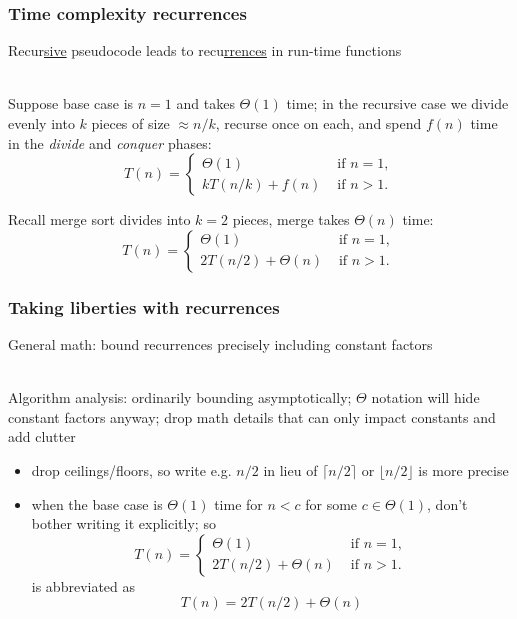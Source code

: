 \documentclass{beamer}
\newcommand{\stanza}{ \\~\ }
\begin{document}
\begin{frame} \frametitle{Time complexity recurrences}

Recur\underline{sive} pseudocode leads to recu\underline{rrences} in
  run-time functions \stanza

Suppose base case is $n=1$ and takes $\Theta(1)$ time; in the recursive
case we divide evenly into $k$ pieces of size $\approx n/k$, recurse once
on each, and spend $f(n)$ time in the \emph{divide} and \emph{conquer}
phases:
\begin{equation*}
  T(n) = \begin{cases}
          \Theta(1) & \text{ if } n=1, \\
          k T(n/k) + f(n) & \text{ if } n > 1 .
        \end{cases}
\end{equation*}

Recall merge sort divides into $k=2$ pieces, merge takes $\Theta(n)$ time:
\begin{equation*}
  T(n) = \begin{cases}
          \Theta(1) & \text{ if } n=1, \\
          2 T(n/2) + \Theta(n) & \text{ if } n > 1 .
        \end{cases}
\end{equation*}
\end{frame}

\begin{frame} \frametitle{Taking liberties with recurrences}
  General math: bound recurrences precisely including constant factors \stanza

  Algorithm analysis: ordinarily bounding asymptotically; $\Theta$ notation will
    hide constant factors anyway; drop math details that can only impact
    constants and add clutter
  \begin{itemize}
    \item drop ceilings/floors, so write e.g. $n/2$ in lieu of $\lceil n/2 \rceil$ or $\lfloor n/2 \rfloor$
      is more precise
    \item when the base case is $\Theta(1)$ time for $n < c$ for some $c \in \Theta(1)$,
      don't bother writing it explicitly; so
      \begin{equation*}
        T(n) = \begin{cases}
                \Theta(1) & \text{ if } n=1, \\
                2 T(n/2) + \Theta(n) & \text{ if } n > 1 .
              \end{cases}
      \end{equation*}
      is abbreviated as
      \[ T(n) = 2 T(n/2) + \Theta(n) \]
    \end{itemize}

\end{frame}
\end{document}
